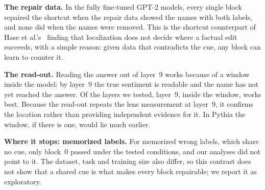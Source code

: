 \textbf{The repair data.} In the fully fine-tuned GPT-2 models, every single block repaired the shortcut when the
repair data showed the names with both labels, and none did when the names were removed. This is the shortcut
counterpart of Hase et al.'s~\cite{hase2023localization} finding that localization does not decide where a factual
edit succeeds, with a simple reason: given data that contradicts the cue, any block can learn to counter it.

\textbf{The read-out.} Reading the answer out of layer~9 works because of a window inside the model: by layer~9 the
true sentiment is readable and the name has not yet reached the answer. Of the layers we tested, layer~9, inside the
window, works best. Because the read-out repeats the lens measurement at layer~9, it confirms the location rather
than providing independent evidence for it. In Pythia the window, if there is one, would lie much earlier.

\textbf{Where it stops: memorized labels.} For memorized wrong labels, which share no cue, only block~0 passed under
the tested conditions, and our analyses did not point to it. The dataset, task and training size also differ, so this
contrast does not show that a shared cue is what makes every block repairable; we report it as exploratory.
